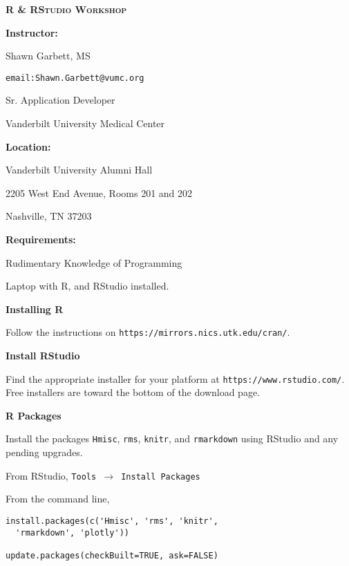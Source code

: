 \documentclass[twocolumn]{article}
\begin{document}
\textbf{\LARGE{\textsc{R \& RStudio Workshop}}}


\vspace*{\fill}

\begin{flushleft}

\textbf{Instructor:}

Shawn Garbett, MS

\texttt{email:Shawn.Garbett@vumc.org}

Sr. Application Developer

Vanderbilt University Medical Center
\end{flushleft}

\vspace*{\fill}

\begin{flushleft}
\textbf{Location:}

Vanderbilt University Alumni Hall

2205 West End Avenue, Rooms 201 and 202

Nashville, TN 37203
\end{flushleft}

\vspace*{\fill}

\begin{flushleft}

\textbf{Requirements:}

Rudimentary Knowledge of Programming

Laptop with R, and RStudio installed.

\end{flushleft}

\vspace*{\fill}

\begin{flushleft}

\textbf{Installing R}

Follow the instructions on \texttt{https://mirrors.nics.utk.edu/cran/}.

\textbf{Install RStudio}

Find the appropriate installer for your platform at \texttt{https://www.rstudio.com/}. Free installers are toward the bottom of the download page.

\textbf{R Packages}

Install the packages \texttt{Hmisc}, \texttt{rms}, \texttt{knitr}, and \texttt{rmarkdown} using RStudio and any pending upgrades.

From RStudio, \texttt{Tools $\rightarrow$ Install Packages}

From the command line,

\begin{framed}
\begin{verbatim}
install.packages(c('Hmisc', 'rms', 'knitr',
  'rmarkdown', 'plotly'))
  
update.packages(checkBuilt=TRUE, ask=FALSE)
\end{verbatim}
\end{framed}

\end{flushleft}
\end{document}
